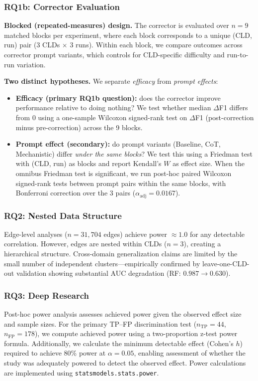 \subsubsection{RQ1b: Corrector Evaluation}
\textbf{Blocked (repeated-measures) design.} The corrector is evaluated over $n=9$ matched blocks per experiment, where each block corresponds to a unique (CLD, run) pair (3 CLDs $\times$ 3 runs). Within each block, we compare outcomes across corrector prompt variants, which controls for CLD-specific difficulty and run-to-run variation.

\textbf{Two distinct hypotheses.} We separate \textit{efficacy} from \textit{prompt effects}:
\begin{itemize}[noitemsep]
    \item \textbf{Efficacy (primary RQ1b question):} does the corrector improve performance relative to doing nothing? We test whether median $\Delta$F1 differs from 0 using a one-sample Wilcoxon signed-rank test on $\Delta$F1 (post-correction minus pre-correction) across the 9 blocks.
    \item \textbf{Prompt effect (secondary):} do prompt variants (Baseline, CoT, Mechanistic) differ \textit{under the same blocks}? We test this using a Friedman test with (CLD, run) as blocks and report Kendall's $W$ as effect size. When the omnibus Friedman test is significant, we run post-hoc paired Wilcoxon signed-rank tests between prompt pairs within the same blocks, with Bonferroni correction over the 3 pairs ($\alpha_{\text{adj}}=0.0167$).
\end{itemize}

\subsubsection{RQ2: Nested Data Structure}
Edge-level analyses ($n = 31{,}704$ edges) achieve power $\approx 1.0$ for any detectable correlation. However, edges are nested within CLDs ($n = 3$), creating a hierarchical structure. Cross-domain generalization claims are limited by the small number of independent clusters---empirically confirmed by leave-one-CLD-out validation showing substantial AUC degradation (RF: $0.987 \rightarrow 0.630$).

\subsubsection{RQ3: Deep Research}
Post-hoc power analysis assesses achieved power given the observed effect size and sample sizes. For the primary TP--FP discrimination test ($n_{\text{TP}}=44$, $n_{\text{FP}}=178$), we compute achieved power using a two-proportion z-test power formula. Additionally, we calculate the minimum detectable effect (Cohen's $h$) required to achieve 80\% power at $\alpha=0.05$, enabling assessment of whether the study was adequately powered to detect the observed effect. Power calculations are implemented using \texttt{statsmodels.stats.power}.

